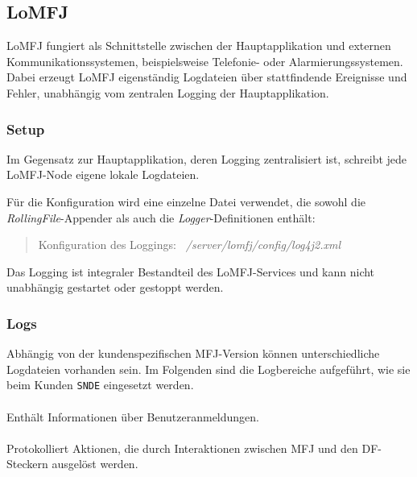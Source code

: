 
\subsection{LoMFJ}

LoMFJ fungiert als Schnittstelle zwischen der Hauptapplikation und externen Kommunikationssystemen, beispielsweise Telefonie- oder Alarmierungssystemen.  
Dabei erzeugt LoMFJ eigenständig Logdateien über stattfindende Ereignisse und Fehler, unabhängig vom zentralen Logging der Hauptapplikation.

\subsubsection{Setup}

Im Gegensatz zur Hauptapplikation, deren Logging zentralisiert ist, schreibt jede LoMFJ-Node eigene lokale Logdateien.

Für die Konfiguration wird eine einzelne Datei verwendet, die sowohl die \textit{RollingFile}-Appender als auch die \textit{Logger}-Definitionen enthält:

\begin{quote}
    Konfiguration des Loggings: \textit{~/server/lomfj/config/log4j2.xml}
\end{quote}

Das Logging ist integraler Bestandteil des LoMFJ-Services und kann nicht unabhängig gestartet oder gestoppt werden.

\subsubsection{Logs}

Abhängig von der kundenspezifischen MFJ-Version können unterschiedliche Logdateien vorhanden sein.  
Im Folgenden sind die Logbereiche aufgeführt, wie sie beim Kunden \texttt{SNDE} eingesetzt werden.

\paragraph{\lomfjAuditLog}
Enthält Informationen über Benutzeranmeldungen.

\paragraph{\lomfjDfLog}
Protokolliert Aktionen, die durch Interaktionen zwischen MFJ und den DF-Steckern ausgelöst werden.

